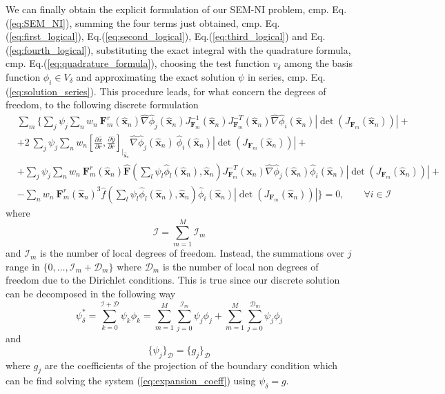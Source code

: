 We can finally obtain the explicit formulation of our SEM-NI problem, cmp. Eq.(\ref{eq:SEM_NI}), summing the four terms just obtained, cmp. Eq.(\ref{eq:first_logical}), Eq.(\ref{eq:second_logical}), Eq.(\ref{eq:third_logical}) and Eq.(\ref{eq:fourth_logical}), substituting the exact integral with the quadrature formula, cmp. Eq.(\ref{eq:quadrature_formula}), choosing the test function $v_{\delta}$ among the basis function $\phi_i\in V_{\delta}$ and approximating the exact solution $\psi$ in series, cmp. Eq.(\ref{eq:solution_series}). This procedure leads, for what concern the degrees of freedom, to the following discrete formulation
\begin{equation}\label{eq:discrete_formulation}
  \begin{split}
    &\sum_m \bigg\{\sum_j \psi_j \sum_n w_n\:\mathbf{F}_m^r(\mathbf{\hat{x}}_n)\hat{\nabla}\hat{\phi}_j(\mathbf{\hat{x}}_n)J_{\mathbf{F}_m}^{-1}(\mathbf{\hat{x}}_n)J_{\mathbf{F}_m}^{-T}(\mathbf{\hat{x}}_n)\hat{\nabla}\hat{\phi}_i(\mathbf{\hat{x}}_n)|\det(J_{\mathbf{F}_m}(\mathbf{\hat{x}}_n))| +\\
    &+2\:\sum_j\psi_j\sum_n w_n[\frac{\partial\hat{x}}{\partial r},\frac{\partial\hat{y}}{\partial r}]_{\big|_{\mathbf{\hat{x}}_n}}\hat{\nabla} \hat{\phi}_j(\mathbf{\hat{x}}_n)\:\hat{\phi}_i(\mathbf{\hat{x}}_n)|\det(J_{\mathbf{F}_m}(\mathbf{\hat{x}}_n))|+\\
    &+\sum_j \psi_j \sum_n w_n\:\mathbf{F}_m^r(\mathbf{\hat{x}}_n)\mathbf{\hat{F}}(\sum_l\psi_l\hat{\phi}_l(\mathbf{\hat{x}}_n),\mathbf{\hat{x}}_n)J_{\mathbf{F}_m}^{-T}(\mathbf{x}_n)\hat{\nabla} \hat{\phi}_j(\mathbf{\hat x}_n)\hat{\phi}_i(\mathbf{\hat{x}}_n)|\det(J_{\mathbf{F}_m}(\mathbf{\hat{x}}_n))|+\\
    &-\sum_n w_n\:\mathbf{F}_m^r(\mathbf{\hat{x}}_n)^3 \hat{f}(\sum_l\psi_l\hat{\phi}_l(\mathbf{\hat{x}}_n),\mathbf{\hat{x}}_n)\hat{\phi}_i(\mathbf{\hat{x}}_n)|\det(J_{\mathbf{F}_m}(\mathbf{\hat{x}}_n))|\bigg\}=0, \qquad\forall i\in\mathcal{I}
  \end{split}
\end{equation}
where
\begin{equation}
\mathcal{I}=\sum_{m=1}^M\mathcal{I}_m
\end{equation}
and $\mathcal{I}_m$ is the number of local degrees of freedom. Instead, the summations over $j$ range in $\{0,\dots,\mathcal{I}_m+\mathcal{D}_m\}$ where $\mathcal{D}_m$ is the number of local non degrees of freedom due to the Dirichlet conditions. This is true since our discrete solution can be decomposed in the following way
\begin{equation}
  \psi^*_\delta=\sum_{k=0}^{\mathcal{I}+\mathcal{D}}\psi_k\phi_k=\sum_{m=1}^M \sum_{j=0}^{\mathcal{I}_m}\psi_j\phi_j+\sum_{m=1}^M \sum_{j=0}^{\mathcal{D}_m}\psi_j\phi_j
\end{equation}
and
\begin{equation}
  \{\psi_j\}_{\mathcal{D}}=\{g_j\}_{\mathcal{D}}
\end{equation}
where $g_j$ are the coefficients of the projection of the boundary condition which can be find solving the system (\ref{eq:expansion_coeff}) using $\psi_{\delta}=g$.

